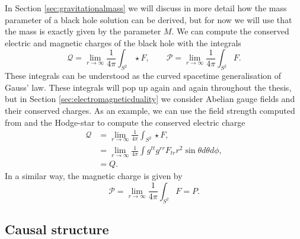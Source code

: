 In Section \ref{sec:gravitationalmass} we will discuss in more detail how the mass parameter of a black hole solution can be derived, but for now we will use that the mass is exactly given by the parameter $M$. We can compute the conserved electric and magnetic charges of the black hole with the integrals
\begin{equation}
\label{eq:gausslawcharges}
	\mathcal{Q} = \lim_{r \rightarrow \infty} \frac{1}{4\pi} \int_{S^2} \star F, \qquad \mathcal{P} = \lim_{r \rightarrow \infty} \frac{1}{4\pi} \int_{S^2} F.
\end{equation}	
These integrals can be understood as the curved spacetime generalisation of Gauss' law. These integrals will pop up again and again throughout the thesis, but in Section \ref{sec:electromagneticduality} we consider Abelian gauge fields and their conserved charges. As an example, we can use the field strength computed from  and the Hodge-star to compute the conserved electric charge
\begin{equation}
\label{eq:rnelecharge}
	\begin{aligned}
		\mathcal{Q} &= \lim_{r \rightarrow \infty} \frac{1}{4\pi} \int_{S^2} \star F, \\
		&= \lim_{r \rightarrow \infty} \frac{1}{4\pi} \int g^{tt} g^{rr} F_{tr} r^2 \sin \theta d\theta d\phi, \\ 
		&= Q.
	\end{aligned}
\end{equation}
In a similar way, the magnetic charge is given by
\begin{equation}
\label{eq:rnmagcharge}
	\mathcal{P} = \lim_{r \rightarrow \infty} \frac{1}{4\pi} \int_{S^2} F = P.
\end{equation}

\subsection{Causal structure}
\label{sec:rncausal}

